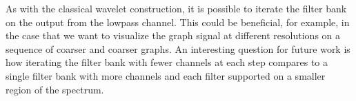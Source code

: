\documentclass[journal, 10pt]{IEEEtran}
\begin{document}
As with the classical wavelet construction, it is possible to iterate the filter bank on the output from the lowpass channel.
This could be beneficial, for example, in the case that we want to visualize the graph signal at different resolutions on  a sequence of coarser and coarser graphs. An interesting question for future work is how iterating the filter bank with fewer channels at each step compares to a single filter bank with more channels and each filter supported on a smaller region of the spectrum.


\balance

{\small }
\end{document}
